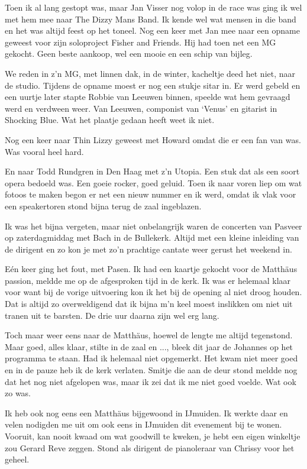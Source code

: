 \documentclass[10pt,twoside,openright]{memoir}
\begin{document}
Toen ik al lang gestopt was, maar Jan Visser nog volop in de race was ging ik wel met hem mee naar The Dizzy Mans Band. Ik kende wel wat mensen in die band en het was altijd feest op het toneel. Nog een keer met Jan mee naar een opname geweest voor zijn soloproject Fisher and Friends. Hij had toen net een MG gekocht. Geen beste aankoop, wel een mooie en een schip van bijleg. 

We reden in z’n MG, met linnen dak, in de winter, kacheltje deed het niet, naar de studio. Tijdens de opname moest er nog een stukje sitar in. Er werd gebeld en een uurtje later stapte Robbie van Leeuwen binnen, speelde wat hem gevraagd werd en verdween weer. Van Leeuwen, componist van ‘Venus’ en gitarist in Shocking Blue. Wat het plaatje gedaan heeft weet ik niet.

Nog een keer naar Thin Lizzy geweest met Howard omdat die er een fan van was. Was vooral heel hard. 

En naar Todd Rundgren in Den Haag met z’n Utopia. Een stuk dat als een soort opera bedoeld was. Een goeie rocker, goed geluid. Toen ik naar voren liep om wat fotoos te maken begon er net een nieuw nummer en ik werd, omdat ik vlak voor een speakertoren stond bijna terug de zaal ingeblazen.

Ik was het bijna vergeten, maar niet onbelangrijk waren de concerten van Pasveer op zaterdagmiddag met Bach in de Bullekerk. Altijd met een kleine inleiding van de dirigent en zo kon je met zo’n prachtige cantate weer gerust het weekend in.

Eén keer ging het fout, met Pasen. Ik had een kaartje gekocht voor de Matthäus passion, meldde me op de afgesproken tijd in de kerk. Ik was er helemaal klaar voor want bij de vorige uitvoering kon ik het bij de opening al niet droog houden. Dat is altijd zo overweldigend dat ik bijna m’n keel moest inslikken om niet uit tranen uit te barsten. De drie uur daarna zijn wel erg lang. 

Toch maar weer eens naar de Matthäus, hoewel de lengte me altijd tegenstond. Maar goed, alles klaar, stilte in de zaal en ..., bleek dit jaar de Johannes op het programma te staan. Had ik helemaal niet opgemerkt. Het kwam niet meer goed en in de pauze heb ik de kerk verlaten. Smitje die aan de deur stond meldde nog dat het nog niet afgelopen was, maar ik zei dat ik me niet goed voelde. Wat ook zo was.

Ik heb ook nog eens een Matthäus bijgewoond in IJmuiden. Ik werkte daar en velen nodigden me uit om ook eens in IJmuiden dit evenement bij te wonen. Vooruit, kan nooit kwaad om wat goodwill te kweken, je hebt een eigen winkeltje zou Gerard Reve zeggen. Stond als dirigent de pianoleraar van Chrissy voor het geheel. 
\end{document}
